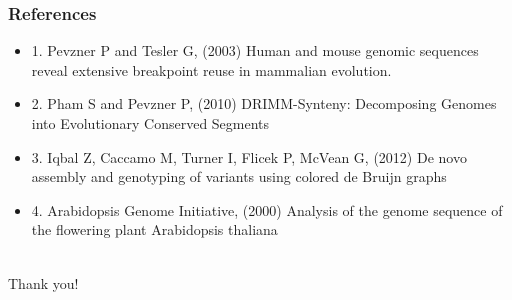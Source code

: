 \documentclass[svgnames,14pt]{beamer}
\begin{document}
\begin{frame}
\frametitle{References}
\begin{itemize}
\item 1. Pevzner P and Tesler G, (2003) Human and mouse genomic sequences reveal extensive breakpoint reuse in mammalian evolution. 
\item 2. Pham S and Pevzner P, (2010) DRIMM-Synteny: Decomposing Genomes into Evolutionary Conserved Segments
\item 3. Iqbal Z, Caccamo M, Turner I, Flicek P, McVean G, (2012) De novo assembly and genotyping of variants using colored de Bruijn graphs
\item 4. Arabidopsis Genome Initiative, (2000) Analysis of the genome sequence of the flowering plant Arabidopsis thaliana
\end{itemize}
\end{frame}

\begin{center}
\hfill \huge \\
\vspace{60pt}
Thank you!
\end{center}
\end{document}
